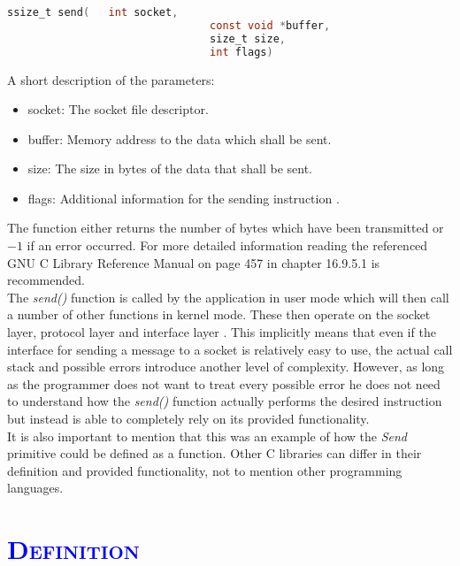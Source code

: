 \documentclass[xcolor=dvipsnames]{article}
\begin{document}
\begin{lstlisting}[language=C, numbers=none]
ssize_t send(  	int socket, 
								const void *buffer, 
								size_t size, 
								int flags)
\end{lstlisting}

\noindent A short description of the parameters:

\begin{itemize}
\item socket: The socket file descriptor.
\item buffer: Memory address to the data which shall be sent.
\item size: The size in bytes of the data that shall be sent.
\item flags: Additional information for the sending instruction \cite[p. 459, ch. 16.9.5.3]{GNU_C_library_manual}.
\end{itemize}

\noindent The function either returns the number of bytes which have been transmitted or $-1$ if an error occurred. For more detailed information reading the referenced GNU C Library Reference Manual \cite{GNU_C_library_manual} on page 457 in chapter 16.9.5.1 is recommended.\\

\noindent The \textit{send()} function is called by the application in user mode which will then call a number of other functions in kernel mode. These then operate on the socket layer, protocol layer and interface layer \cite[p. 2, 16]{IBM_Anupama}. This implicitly means that even if the interface for sending a message to a socket is relatively easy to use, the actual call stack and possible errors introduce another level of complexity. However, as long as the programmer does not want to treat every possible error he does not need to understand how the \textit{send()} function actually performs the desired instruction but instead is able to completely rely on its provided functionality.\\

\noindent It is also important to mention that this was an example of how the \textit{Send} primitive could be defined as a function. Other C libraries can differ in their definition and provided functionality, not to mention other programming languages.

\section{\scshape{\textcolor{blue}{Definition}}} \label{definition}
\end{document}
